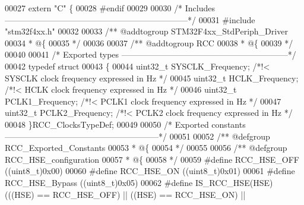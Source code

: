 \begin{DoxyCode}
00027  \textcolor{keyword}{extern} \textcolor{stringliteral}{"C"} \{
00028 \textcolor{preprocessor}{#}\textcolor{preprocessor}{endif}
00029 
00030 \textcolor{comment}{/* Includes ------------------------------------------------------------------*/}
00031 \textcolor{preprocessor}{#}\textcolor{preprocessor}{include} "stm32f4xx.h"
00032 
00033 \textcolor{comment}{/** @addtogroup STM32F4xx\_StdPeriph\_Driver}
00034 \textcolor{comment}{  * @\{}
00035 \textcolor{comment}{  */}
00036 
00037 \textcolor{comment}{/** @addtogroup RCC}
00038 \textcolor{comment}{  * @\{}
00039 \textcolor{comment}{  */}
00040 
00041 \textcolor{comment}{/* Exported types ------------------------------------------------------------*/}
00042 \textcolor{keyword}{typedef} \textcolor{keyword}{struct}
00043 \{
00044   uint32\_t SYSCLK_Frequency; \textcolor{comment}{/*!<  SYSCLK clock frequency expressed in Hz */}
00045   uint32\_t HCLK_Frequency;   \textcolor{comment}{/*!<  HCLK clock frequency expressed in Hz */}
00046   uint32\_t PCLK1_Frequency;  \textcolor{comment}{/*!<  PCLK1 clock frequency expressed in Hz */}
00047   uint32\_t PCLK2_Frequency;  \textcolor{comment}{/*!<  PCLK2 clock frequency expressed in Hz */}
00048 \}RCC\_ClocksTypeDef;
00049 
00050 \textcolor{comment}{/* Exported constants --------------------------------------------------------*/}
00051 
00052 \textcolor{comment}{/** @defgroup RCC\_Exported\_Constants}
00053 \textcolor{comment}{  * @\{}
00054 \textcolor{comment}{  */}
00055 
00056 \textcolor{comment}{/** @defgroup RCC\_HSE\_configuration }
00057 \textcolor{comment}{  * @\{}
00058 \textcolor{comment}{  */}
00059 \textcolor{preprocessor}{#}\textcolor{preprocessor}{define} \textcolor{preprocessor}{RCC\_HSE\_OFF}                      \textcolor{preprocessor}{(}\textcolor{preprocessor}{(}\textcolor{preprocessor}{uint8\_t}\textcolor{preprocessor}{)}0x00\textcolor{preprocessor}{)}
00060 \textcolor{preprocessor}{#}\textcolor{preprocessor}{define} \textcolor{preprocessor}{RCC\_HSE\_ON}                       \textcolor{preprocessor}{(}\textcolor{preprocessor}{(}\textcolor{preprocessor}{uint8\_t}\textcolor{preprocessor}{)}0x01\textcolor{preprocessor}{)}
00061 \textcolor{preprocessor}{#}\textcolor{preprocessor}{define} \textcolor{preprocessor}{RCC\_HSE\_Bypass}                   \textcolor{preprocessor}{(}\textcolor{preprocessor}{(}\textcolor{preprocessor}{uint8\_t}\textcolor{preprocessor}{)}0x05\textcolor{preprocessor}{)}
00062 \textcolor{preprocessor}{#}\textcolor{preprocessor}{define} \textcolor{preprocessor}{IS\_RCC\_HSE}\textcolor{preprocessor}{(}\textcolor{preprocessor}{HSE}\textcolor{preprocessor}{)} \textcolor{preprocessor}{(}\textcolor{preprocessor}{(}\textcolor{preprocessor}{(}\textcolor{preprocessor}{HSE}\textcolor{preprocessor}{)} \textcolor{preprocessor}{==} RCC_HSE_OFF\textcolor{preprocessor}{)} \textcolor{preprocessor}{||} \textcolor{preprocessor}{(}\textcolor{preprocessor}{(}\textcolor{preprocessor}{HSE}\textcolor{preprocessor}{)} \textcolor{preprocessor}{==} RCC_HSE_ON\textcolor{preprocessor}{)} \textcolor{preprocessor}{||}

\end{DoxyCode}
